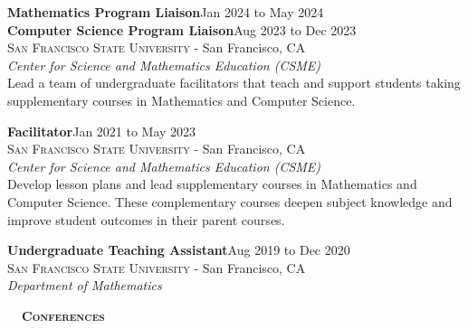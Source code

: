 \documentclass[hidelinks, 10.5pt]{article}
\def\contentwidth{0.9\linewidth}    %
\def\contentspacing{2.5mm}          %
\def\sectionspacing{8mm}            %
\renewcommand{\section}[1]{
    {\fontsize{14}{14}\selectfont \textsc{\textbf{\ \ #1\ \ }}}\hrulefill
}
\begin{document}
{\vspace{\contentspacing}

\begin{minipage}[ct]{\contentwidth}
    \textbf{Mathematics Program Liaison}\hfill Jan 2024 to May 2024\\
    \textbf{Computer Science Program Liaison}\hfill Aug 2023 to Dec 2023\\
    {\textsc{San Francisco State University} - San Francisco, CA}\\
    \textit{Center for Science and Mathematics Education (CSME)}\\
    Lead a team of undergraduate facilitators that teach and support students taking supplementary courses in Mathematics and Computer
    Science.
\end{minipage}

\vspace{\contentspacing}

\begin{minipage}[ct]{\contentwidth}
    \textbf{Facilitator}\hfill Jan 2021 to May 2023\\
    {\textsc{San Francisco State University} - San Francisco, CA}\\
    \textit{Center for Science and Mathematics Education (CSME)}\\
    Develop lesson plans and lead supplementary courses in Mathematics and Computer Science.  These complementary courses deepen subject
    knowledge and improve student outcomes in their parent courses.
\end{minipage}

\vspace{\contentspacing}

\begin{minipage}[ct]{\contentwidth}
    \textbf{Undergraduate Teaching Assistant}\hfill Aug 2019 to Dec 2020\\
    {\textsc{San Francisco State University} - San Francisco, CA}\\
    \textit{Department of Mathematics}
\end{minipage}

\vspace{\sectionspacing}


\section{Conferences}

}
\end{document}
